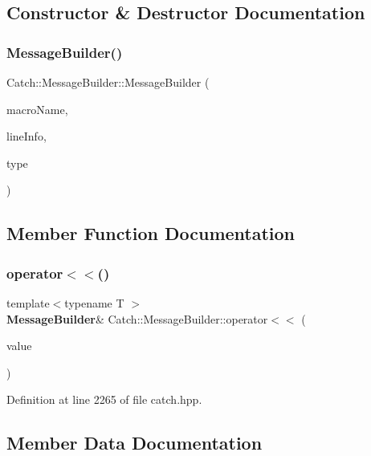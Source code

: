 \subsection{Constructor \& Destructor Documentation}
\mbox{\label{struct_catch_1_1_message_builder_ac34832ca527a758f000ac233d32dd068}} 
\subsubsection{MessageBuilder()}
{\footnotesize\ttfamily Catch\+::\+Message\+Builder\+::\+Message\+Builder (\begin{DoxyParamCaption}\item[{\textbf{ String\+Ref} const \&}]{macro\+Name,  }\item[{\textbf{ Source\+Line\+Info} const \&}]{line\+Info,  }\item[{\textbf{ Result\+Was\+::\+Of\+Type}}]{type }\end{DoxyParamCaption})}



\subsection{Member Function Documentation}
\mbox{\label{struct_catch_1_1_message_builder_a20fa48d069b20dddcc2d3df8abb123c1}} 
\subsubsection{operator$<$$<$()}
{\footnotesize\ttfamily template$<$typename T $>$ \\
\textbf{ Message\+Builder}\& Catch\+::\+Message\+Builder\+::operator$<$$<$ (\begin{DoxyParamCaption}\item[{T const \&}]{value }\end{DoxyParamCaption})\hspace{0.3cm}{\ttfamily [inline]}}



Definition at line 2265 of file catch.\+hpp.



\subsection{Member Data Documentation}
\mbox{\label{struct_catch_1_1_message_builder_a979f1c2b36d78f80ee275bfa5ba0209f}} 
